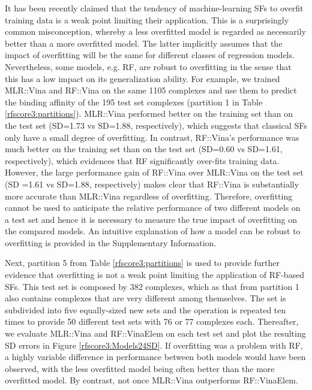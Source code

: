 It has been recently claimed \citep{1372} that the tendency of machine-learning SFs to overfit training data is a weak point limiting their application. This is a surprisingly common misconception, whereby a less overfitted model is regarded as necessarily better than a more overfitted model. The latter implicitly assumes that the impact of overfitting will be the same for different classes of regression models. Nevertheless, some models, e.g. RF, are robust to overfitting in the sense that this has a low impact on its generalization ability. For example, we trained MLR::Vina and RF::Vina on the same 1105 complexes and use them to predict the binding affinity of the 195 test set complexes (partition 1 in Table \ref{rfscore3:partitions}). MLR::Vina performed better on the training set than on the test set (SD=1.73 vs SD=1.88, respectively), which suggests that classical SFs only have a small degree of overfitting. In contrast, RF::Vina's performance was much better on the training set than on the test set (SD=0.60 vs SD=1.61, respectively), which evidences that RF significantly over-fits training data. However, the large performance gain of RF::Vina over MLR::Vina on the test set (SD =1.61 vs SD=1.88, respectively) makes clear that RF::Vina is substantially more accurate than MLR::Vina regardless of overfitting. Therefore, overfitting cannot be used to anticipate the relative performance of two different models on a test set and hence it is necessary to measure the true impact of overfitting on the compared models. An intuitive explanation of how a model can be robust to overfitting is provided in the Supplementary Information.

Next, partition 5 from Table \ref{rfscore3:partitions} is used to provide further evidence that overfitting is not a weak point limiting the application of RF-based SFs. This test set is composed by 382 complexes, which as that from partition 1 also contains complexes that are very different among themselves. The set is subdivided into five equally-sized new sets and the operation is repeated ten times to provide 50 different test sets with 76 or 77 complexes each. Thereafter, we evaluate MLR::Vina and RF::VinaElem on each test set and plot the resulting SD errors in Figure \ref{rfscore3:Models24SD}. If overfitting was a problem with RF, a highly variable difference in performance between both models would have been observed, with the less overfitted model being often better than the more overfitted model. By contrast, not once MLR::Vina outperforms RF::VinaElem. 

